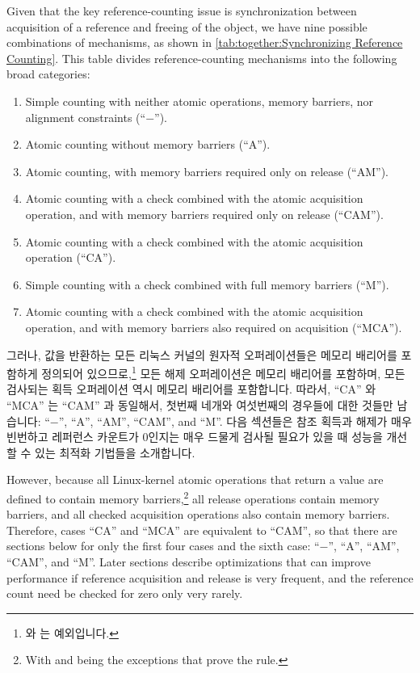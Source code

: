 Given that the key reference-counting issue
is synchronization between acquisition
of a reference and freeing of the object, we have nine possible
combinations of mechanisms, as shown in
\cref{tab:together:Synchronizing Reference Counting}.
This table
divides reference-counting mechanisms into the following broad categories:
\begin{enumerate}
\item	Simple counting with neither atomic operations, memory
	barriers, nor alignment constraints (``$-$'').
\item	Atomic counting without memory barriers (``A'').
\item	Atomic counting, with memory barriers required only on release
	(``AM'').
\item	Atomic counting with a check combined with the atomic acquisition
	operation, and with memory barriers required only on release
	(``CAM'').
\item	Atomic counting with a check combined with the atomic acquisition
	operation (``CA'').
\item	Simple counting with a check combined with full memory barriers
	(``M'').
\item	Atomic counting with a check combined with the atomic acquisition
	operation, and with memory barriers also required on acquisition
	(``MCA'').
\end{enumerate}

\fi

그러나, 값을 반환하는 모든 리눅스 커널의 원자적 오퍼레이션들은 메모리 배리어를
포함하게 정의되어 있으므로,\footnote{
	 와  는 예외입니다.}
모든 해제 오퍼레이션은 메모리 배리어를 포함하며, 모든 검사되는 획득 오퍼레이션
역시 메모리 배리어를 포함합니다.
따라서, ``CA'' 와 ``MCA'' 는 ``CAM'' 과 동일해서, 첫번째 네개와 여섯번째의
경우들에 대한 것들만 남습니다: ``$-$'', ``A'', ``AM'', ``CAM'', and ``M''.
다음 섹션들은 참조 획득과 해제가 매우 빈번하고 레퍼런스 카운트가 0인지는 매우
드물게 검사될 필요가 있을 때 성능을 개선할 수 있는 최적화 기법들을 소개합니다.

\iffalse

However, because all Linux-kernel atomic operations that return a
value are defined to contain memory barriers,\footnote{
	With  and  being the
	exceptions that prove the rule.}
all release operations
contain memory barriers, and all checked acquisition operations also
contain memory barriers.
Therefore, cases ``CA'' and ``MCA'' are equivalent to ``CAM'', so that
there are sections below for only the first four cases and the sixth case:
``$-$'', ``A'', ``AM'', ``CAM'', and ``M''.
Later sections describe optimizations that can improve performance
if reference acquisition and release is very frequent, and the
reference count need be checked for zero only very rarely.

